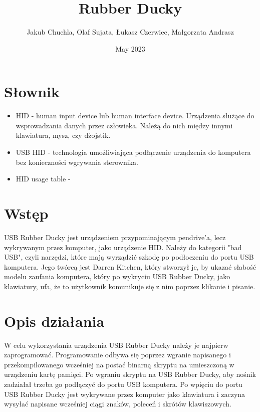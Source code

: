 \documentclass{article}
\title{Rubber Ducky}
\author{Jakub Chuchla, Olaf Sujata, Łukasz Czerwiec, Małgorzata Andrasz}
\date{May 2023}
\begin{document}
\maketitle

\tableofcontents

\section{Słownik}
\begin{itemize}
    \item HID - human input device lub human interface device. Urządzenia służące do wsprowadzania danych przez człowieka. Należą do nich między innymi klawiatura, mysz, czy dżojstik.
    \item USB HID - technologia umożliwiająca podłączenie urządzenia do komputera bez konieczności wgrywania sterownika.
    \item HID usage table - 
\end{itemize}

\section{Wstęp}
USB Rubber Ducky jest urządzeniem przypominającym pendrive'a, lecz wykrywanym przez komputer, jako urządzenie HID. Należy do kategorii "bad USB", czyli narzędzi, które mają wyrządzić szkodę po podłoczeniu do portu USB komputera. Jego twórcą jest Darren Kitchen, który stworzył je, by ukazać słabość modelu zaufania komputera, który po wykryciu USB Rubber Ducky, jako klawiatury, ufa, że to użytkownik komunikuje się z nim poprzez klikanie i pisanie.

\section{Opis działania}
W celu wykorzystania urządzenia USB Rubber Ducky należy je najpierw zaprogramować. Programowanie odbywa się poprzez wgranie napisanego i przekompilowanego wcześniej na postać binarną skryptu na umieszczoną w urządzeniu kartę pamięci. Po wgraniu skryptu na USB Rubber Ducky, aby nośnik zadziałał trzeba go podłączyć do portu USB komputera. Po wpięciu do portu USB Rubber Ducky jest wykrywane przez komputer jako klawiatura i zaczyna wysyłać napisane wcześniej ciągi znaków, poleceń i skrótów klawiszowych.
\end{document}
